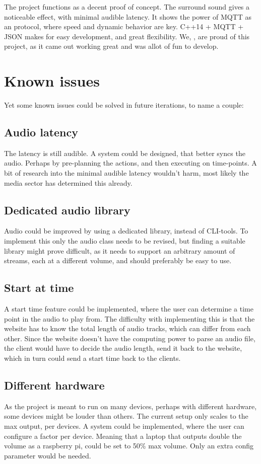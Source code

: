 The project functions as a decent proof of concept.
The surround sound gives a noticeable effect, with minimal audible latency.
It shows the power of MQTT as an  protocol, where speed and dynamic behavior are key.
C++14 + MQTT + JSON makes for easy development, and great flexibility.
We, , are proud of this project, as it came out working great and was allot of fun to develop.

\section{Known issues}
Yet some known issues could be solved in future iterations, to name a couple:

\subsection{Audio latency}
The latency is still audible. A system could be designed, that better syncs the audio.
Perhaps by pre-planning the actions, and then executing on time-points.
A bit of research into the minimal audible latency wouldn't harm, most likely the media sector has determined this already.

\subsection{Dedicated audio library}
Audio could be improved by using a dedicated library, instead of CLI-tools.
To implement this only the audio class needs to be revised, but finding a suitable library might prove difficult,
as it needs to support an arbitrary amount of streams, each at a different volume, and should preferably be easy to use.

\subsection{Start at time}
A start time feature could be implemented, where the user can determine a time point in the audio to play from.
The difficulty with implementing this is that the website has to know the total length of audio tracks, which can differ from each other.
Since the website doesn't have the computing power to parse an audio file, the client would have to decide the audio length, send it back to the website, which in turn could send a start time back to the clients.

\subsection{Different hardware}
As the project is meant to run on many devices, perhaps with different hardware, some devices might be louder than others.
The current setup only scales to the max output, per devices. A system could be implemented, where the user can configure a factor per device.
Meaning that a laptop that outputs double the volume as a raspberry pi, could be set to 50\% max volume. Only an extra config parameter would be needed.

